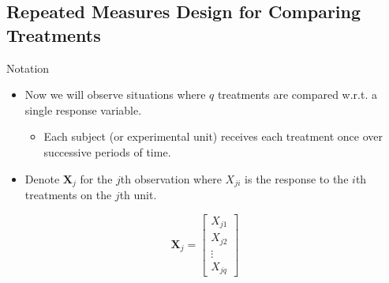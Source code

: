 \documentclass[8pt]{beamer}
\begin{document}
\subsection{Repeated Measures Design for Comparing Treatments}
        \begin{frame}{Notation}
            \begin{itemize}
                \item Now we will observe situations where $q$ treatments are compared w.r.t. a single response variable. 
                \begin{itemize}
                    \item Each subject (or experimental unit) receives each treatment once over successive periods of time. 
                \end{itemize}
                
                \item Denote $\mathbf{X}_{j}$ for the $j$th observation where $X_{ji}$ is the response to the $i$th treatments on the $j$th unit. 
            \end{itemize}
            
            \begin{equation*}
                \mathbf{X}_{j} = \begin{bmatrix}
                    X_{j1} \\
                    X_{j2} \\ 
                    \vdots \\
                    X_{jq}
                \end{bmatrix}
            \end{equation*}
        \end{frame}
        
\end{document}

